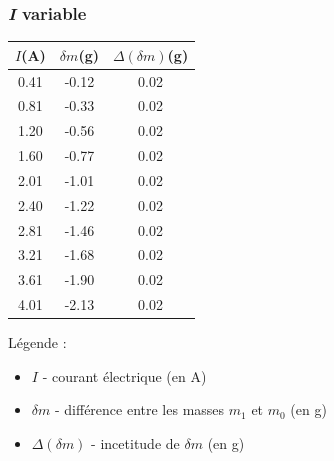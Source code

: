 \documentclass[12pt,a4paper]{article}
\begin{document}
    \subsubsection{\textit{I} variable}
    \begin{minipage}{0.4\textwidth}
        \centering
        \begin{tabular}{c|c|c}
            \toprule
            $I$(A) & $\delta m$(g) & $\Delta(\delta m)$(g) \\
            \midrule
            0.41 & -0.12 & 0.02 \\
            0.81 & -0.33 & 0.02 \\
            1.20 & -0.56 & 0.02 \\
            1.60 & -0.77 & 0.02 \\
            2.01 & -1.01 & 0.02 \\
            2.40 & -1.22 & 0.02 \\
            2.81 & -1.46 & 0.02 \\
            3.21 & -1.68 & 0.02 \\
            3.61 & -1.90 & 0.02 \\
            4.01 & -2.13 & 0.02 \\
            \bottomrule
        \end{tabular}
    \end{minipage}%
    \hfill
    \begin{minipage}{0.6\textwidth}
        Légende :
        \begin{itemize}
            \item $I$ - courant électrique (en A)
            \item $\delta m$ - différence entre les masses $m_1$ et $m_0$ (en g)
            \item $\Delta(\delta m)$ - incetitude de $\delta m$ (en g)
        \end{itemize}
    \end{minipage}
\end{document}
